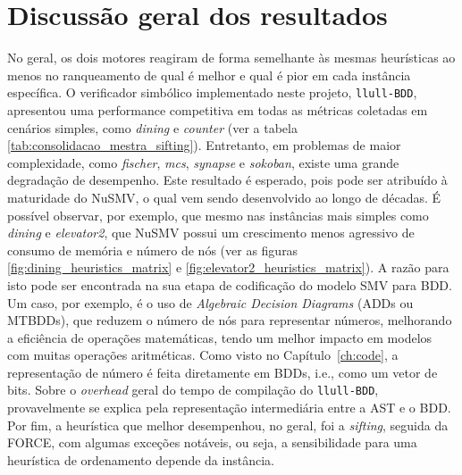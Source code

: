 \documentclass[cic,tc]{infufrgs}
\begin{document}
	\section{Discussão geral dos resultados}
	\label{sec:disc_geral}
	No geral, os dois motores reagiram de forma semelhante às mesmas heurísticas ao menos no ranqueamento de qual é melhor e qual é pior em cada instância específica.
	O verificador simbólico implementado neste projeto, \texttt{llull-BDD}, apresentou uma performance competitiva em todas as métricas coletadas em cenários simples, como \textit{dining} e \textit{counter} (ver a tabela \ref{tab:consolidacao_mestra_sifting}).
	Entretanto, em problemas de maior complexidade, como \textit{fischer}, \textit{mcs}, \textit{synapse} e \textit{sokoban}, existe uma grande degradação de desempenho.
	Este resultado é esperado, pois pode ser atribuído à maturidade do NuSMV, o qual vem sendo desenvolvido ao longo de décadas. 
	É possível observar, por exemplo, que mesmo nas instâncias mais simples como \textit{dining} e \textit{elevator2}, que NuSMV possui um crescimento menos agressivo de consumo de memória e número de nós (ver as figuras \ref{fig:dining_heuristics_matrix} e \ref{fig:elevator2_heuristics_matrix}).
	A razão para isto pode ser encontrada na sua etapa de codificação do modelo SMV para BDD.
	Um caso, por exemplo, é o uso de \textit{Algebraic Decision Diagrams} (ADDs ou MTBDDs), que reduzem o número de nós para representar números, melhorando a eficiência de operações matemáticas, tendo um melhor impacto em modelos com muitas operações aritméticas. 
	Como visto no Capítulo~\ref{ch:code}, a representação de número é feita diretamente em BDDs, i.e., como um vetor de bits.
	Sobre o \textit{overhead} geral do tempo de compilação do \texttt{llull-BDD}, provavelmente se explica pela representação intermediária entre a AST e o BDD.
	Por fim, a heurística que melhor desempenhou, no geral, foi a \textit{sifting}, seguida da FORCE, com algumas exceções notáveis, ou seja, a sensibilidade para uma heurística de ordenamento depende da instância.
	
\end{document}
